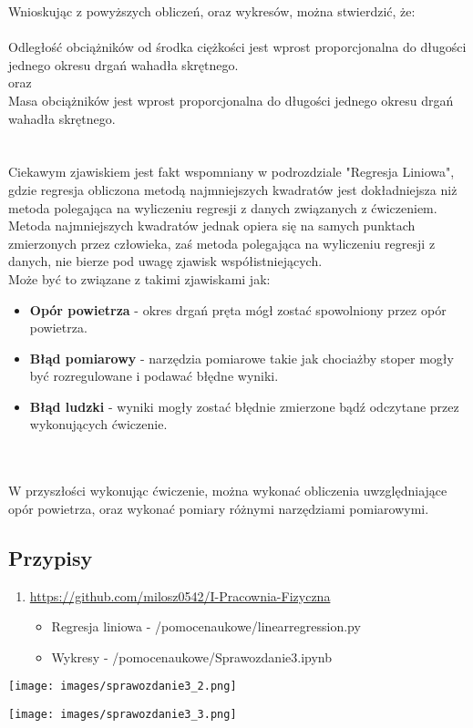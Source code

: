 \documentclass{article}
\begin{document}
{
Wnioskując z powyższych obliczeń, oraz wykresów, można stwierdzić, że: \\
\textbf{} \\
Odległość obciążników od środka ciężkości jest wprost proporcjonalna do długości jednego okresu drgań wahadła skrętnego. \\
oraz \\
Masa obciążników jest wprost proporcjonalna do długości jednego okresu drgań wahadła skrętnego. \\
\textbf{} \\
\textbf{} \\
Ciekawym zjawiskiem jest fakt wspomniany w podrozdziale "Regresja Liniowa", gdzie regresja obliczona metodą najmniejszych kwadratów jest dokładniejsza niż metoda polegająca na wyliczeniu regresji z danych związanych z ćwiczeniem. \\
Metoda najmniejszych kwadratów jednak opiera się na samych punktach zmierzonych przez człowieka, zaś metoda polegająca na wyliczeniu regresji z danych, nie bierze pod uwagę zjawisk współistniejących. \\
Może być to związane z takimi zjawiskami jak:
\begin{itemize}
    \item \textbf{Opór powietrza} - okres drgań pręta mógł zostać spowolniony przez opór powietrza.
    \item \textbf{Błąd pomiarowy} - narzędzia pomiarowe takie jak chociażby stoper mogły być rozregulowane i podawać błędne wyniki.
    \item \textbf{Błąd ludzki} - wyniki mogły zostać błędnie zmierzone bądź odczytane przez wykonujących ćwiczenie.
\end{itemize}
\textbf{} \\
\textbf{} \\
W przyszłości wykonując ćwiczenie, można wykonać obliczenia uwzględniające opór powietrza, oraz wykonać pomiary różnymi narzędziami pomiarowymi.
}

\subsection*{Przypisy}
\begin{enumerate}
    \item {\href{https://github.com/milosz0542/I-Pracownia-Fizyczna}{https://github.com/milosz0542/I-Pracownia-Fizyczna}}
    \begin{itemize}
        \item Regresja liniowa - /pomocenaukowe/linearregression.py
        \item Wykresy - /pomocenaukowe/Sprawozdanie3.ipynb
    \end{itemize}
\end{enumerate}

\pagebreak
\texttt{[image: images/sprawozdanie3\_2.png]}

\pagebreak
\texttt{[image: images/sprawozdanie3\_3.png]}
\end{document}
